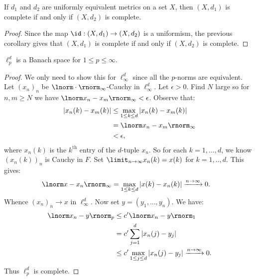     \begin{corollary}
        If $d_1$ and $d_2$ are uniformly equivalent metrics on a set $X$, then $(X,d_1)$ is complete if and only if $(X,d_2)$ is complete.
    \end{corollary}
        \begin{proof}
            Since the map $\id:(X,d_1) \rightarrow (X,d_2)$ is a uniformism, the previous corollary gives that $(X,d_1)$ is complete if and only if $(X,d_2)$ is complete.
        \end{proof}
    

    \begin{proposition} 
        $\ell_p^d$ is a Banach space for $1 \leq p \leq \infty$.
    \end{proposition}
        \begin{proof}
            We only need to show this for $\ell_\infty^d$ since all the $p$-norms are equivalent. Let $(x_n)_n$ be $\lnorm \cdot \rnorm_\infty$-Cauchy in $\ell_\infty^d$. Let $\epsilon > 0$. Find $N$ large so for $n,m \geq N$ we have $\lnorm x_n - x_m \rnorm_\infty < \epsilon$. Observe that:
                \begin{equation*}
                \begin{split}
                    |x_n(k) - x_m(k)|
                    & \leq \max_{1 \leq k \leq d}|x_n(k) - x_m(k)| \\
                    & = \lnorm x_n - x_m \rnorm_\infty \\
                    & < \epsilon,
                \end{split}
                \end{equation*}
            where $x_n(k)$ is the $k^\text{th}$ entry of the $d$-tuple $x_n$. So for each $k = 1,...,d$, we know $(x_n(k))_{n}$ is Cauchy in $F$. Set $\limit_{n \rightarrow \infty}x_n(k) = x(k)$ for $k=1,..,d$. This gives:
                \begin{equation*}
                \begin{split}
                    \lnorm x - x_n \rnorm_\infty 
                    & = \max_{1 \leq k \leq d}|x(k) - x_n(k)| \xrightarrow{n \rightarrow \infty} 0.
                \end{split}
                \end{equation*}
            Whence $(x_n)_n \rightarrow x$ in $\ell_\infty^d$. Now set $y = (y_1,...,y_n)$. We have:
                \begin{equation*}
                \begin{split}
                    \lnorm x_n - y \rnorm_p 
                    & \leq c' \lnorm x_n - y \rnorm_1 \\
                    & = c' \sum_{j = 1}^d |x_n(j) - y_j | \\
                    & \leq c' \max_{1 \leq j \leq d}\left| x_n(j) - y_j \right| \xrightarrow{n\rightarrow \infty} 0.
                \end{split}
                \end{equation*}
            Thus $\ell_p^d$ is complete.
        \end{proof}

